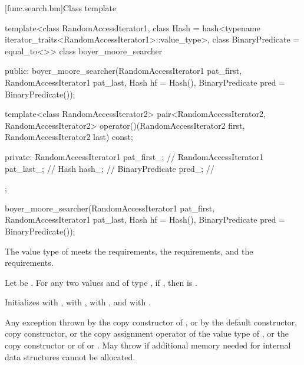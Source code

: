 [func.search.bm]{Class template }

%
\begin{codeblock}
template<class RandomAccessIterator1,
         class Hash = hash<typename iterator_traits<RandomAccessIterator1>::value_type>,
         class BinaryPredicate = equal_to<>>
  class boyer_moore_searcher {
  public:
    boyer_moore_searcher(RandomAccessIterator1 pat_first,
                         RandomAccessIterator1 pat_last,
                         Hash hf = Hash(),
                         BinaryPredicate pred = BinaryPredicate());

    template<class RandomAccessIterator2>
      pair<RandomAccessIterator2, RandomAccessIterator2>
        operator()(RandomAccessIterator2 first, RandomAccessIterator2 last) const;

  private:
    RandomAccessIterator1 pat_first_;   // \expos
    RandomAccessIterator1 pat_last_;    // \expos
    Hash hash_;                         // \expos
    BinaryPredicate pred_;              // \expos
  };
\end{codeblock}

%
\begin{itemdecl}
boyer_moore_searcher(RandomAccessIterator1 pat_first,
                     RandomAccessIterator1 pat_last,
                     Hash hf = Hash(),
                     BinaryPredicate pred = BinaryPredicate());
\end{itemdecl}

\begin{itemdescr}
\pnum
\expects
The value type of  meets
the  requirements,
the  requirements, and
the  requirements.

\pnum
Let  be .
For any two values  and  of type ,
if , then  is .

\pnum
\effects
Initializes
 with ,
 with ,
 with , and
 with .

\pnum
\throws
Any exception thrown by the copy constructor of ,
or by the default constructor, copy constructor, or the copy assignment operator of the value type of ,
or the copy constructor or  of  or .
May throw  if additional memory needed for internal data structures cannot be allocated.
\end{itemdescr}

